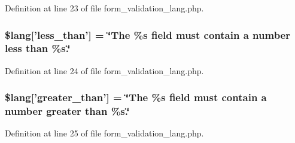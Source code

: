Definition at line 23 of file form\-\_\-validation\-\_\-lang.\-php.

\subsubsection[{\$lang}]{\setlength{\rightskip}{0pt plus 5cm}\$lang['less\-\_\-than'] = \char`\"{}The \%{\bf s} field must contain {\bf a} number less than \%s.\char`\"{}}\label{form__validation__lang_8php_a6037a90e37e5d1bd139c641ae955f2b9}


Definition at line 24 of file form\-\_\-validation\-\_\-lang.\-php.

\subsubsection[{\$lang}]{\setlength{\rightskip}{0pt plus 5cm}\$lang['greater\-\_\-than'] = \char`\"{}The \%{\bf s} field must contain {\bf a} number greater than \%s.\char`\"{}}\label{form__validation__lang_8php_a6e4bd5ad6a3238d9be1ca6f810eac978}


Definition at line 25 of file form\-\_\-validation\-\_\-lang.\-php.

